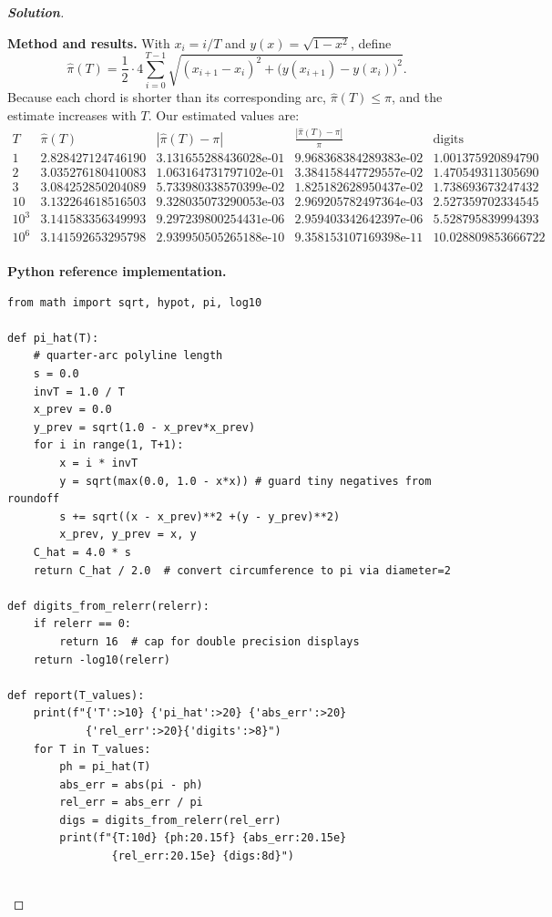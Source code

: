 \documentclass[11pt]{article}
\newenvironment{spacedproof}[1][\proofname]{%
  \begin{proof}[\textbf{#1}]$ $\par\nobreak\ignorespaces
}{%
  \end{proof}
}
\theoremstyle{definition}
\begin{document}
\begin{spacedproof}[Solution]
\textbf{Method and results.}
With $x_i = i/T$ and $y(x) = \sqrt{1 - x^2}$, define
\[
\widehat{\pi}(T) = \frac{1}{2}\cdot 4 \sum_{i=0}^{T-1} \sqrt{(x_{i+1}-x_i)^2 + \bigl(y(x_{i+1}) - y(x_i)\bigr)^2}.
\]
Because each chord is shorter than its corresponding arc, $\widehat{\pi}(T) \le \pi$, and the estimate increases with $T$. Our estimated values are:
\[
\begin{array}{r|r|r|r|r}
T & \widehat{\pi}(T) & |\widehat{\pi}(T)-\pi| & \frac{|\widehat{\pi}(T)-\pi|}{\pi} & \text{digits} \\
\hline
1 & 2.828427124746190 & 3.131655288436028\text{e-}01 & 9.968368384289383\text{e-}02 & 1.001375920894790 \\
2 & 3.035276180410083 & 1.063164731797102\text{e-}01 & 3.384158447729557\text{e-}02 & 1.470549311305690 \\
3 & 3.084252850204089 & 5.733980338570399\text{e-}02 & 1.825182628950437\text{e-}02 & 1.738693673247432 \\
10 & 3.132264618516503 & 9.328035073290053\text{e-}03 & 2.969205782497364\text{e-}03 & 2.527359702334545 \\
10^3 & 3.141583356349993 & 9.297239800254431\text{e-}06 & 2.959403342642397\text{e-}06 & 5.528795839994393 \\
10^6 & 3.141592653295798 & 2.939950505265188\text{e-}10 & 9.358153107169398\text{e-}11 & 10.028809853666722 \\
\end{array}
\]

\textbf{Python reference implementation.}
\begin{lstlisting}
from math import sqrt, hypot, pi, log10

def pi_hat(T):
    # quarter-arc polyline length
    s = 0.0
    invT = 1.0 / T
    x_prev = 0.0
    y_prev = sqrt(1.0 - x_prev*x_prev)
    for i in range(1, T+1):
        x = i * invT
        y = sqrt(max(0.0, 1.0 - x*x)) # guard tiny negatives from roundoff
        s += sqrt((x - x_prev)**2 +(y - y_prev)**2)
        x_prev, y_prev = x, y
    C_hat = 4.0 * s
    return C_hat / 2.0  # convert circumference to pi via diameter=2

def digits_from_relerr(relerr):
    if relerr == 0:
        return 16  # cap for double precision displays
    return -log10(relerr)

def report(T_values):
    print(f"{'T':>10} {'pi_hat':>20} {'abs_err':>20}
            {'rel_err':>20}{'digits':>8}")
    for T in T_values:
        ph = pi_hat(T)
        abs_err = abs(pi - ph)
        rel_err = abs_err / pi
        digs = digits_from_relerr(rel_err)
        print(f"{T:10d} {ph:20.15f} {abs_err:20.15e}
                {rel_err:20.15e} {digs:8d}")


\end{lstlisting}
\end{spacedproof}
\end{document}
